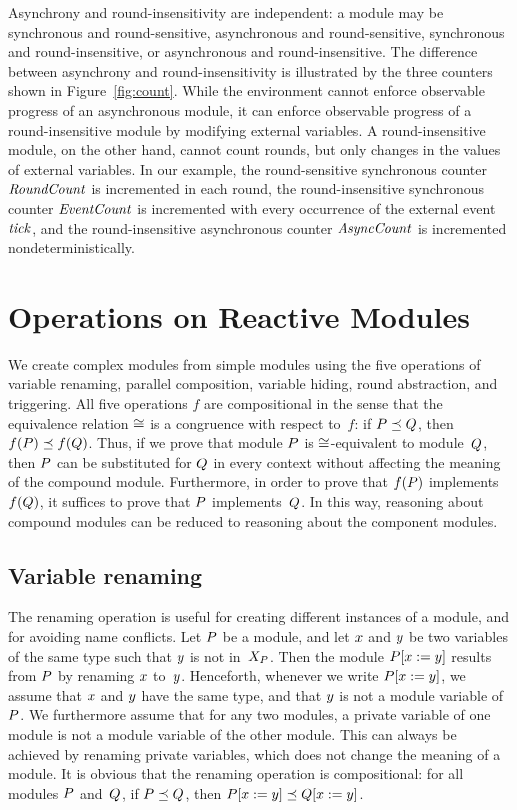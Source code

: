 \mypar
Asynchrony and round-insensitivity are independent:
a module may be synchronous and round-sensitive, asynchronous and
round-sensitive, synchronous and round-insensitive, or asynchronous and
round-insensitive.
The difference between asynchrony and round-insensitivity is illustrated by
the three counters shown in Figure~\ref{fig:count}.
While the environment cannot enforce observable progress of an asynchronous
module, it can enforce observable progress of a round-insensitive module by
modifying external variables.
A round-insensitive module, on the other hand, cannot count rounds, but only
changes in the values of external variables.
In our example, the round-sensitive synchronous counter ${\it RoundCount\/}$ is
incremented in each round, the round-insensitive synchronous counter
${\it EventCount\/}$ is incremented with every occurrence of the external event~${\it tick\/}$,
and the round-insensitive asynchronous counter ${\it AsyncCount\/}$ is incremented
nondeterministically.


\section{Operations on Reactive Modules}

We create complex modules from simple modules using the five operations of
variable renaming, parallel composition, variable hiding, round abstraction,
and triggering.
All five operations $f$ are compositional in the sense that the
equivalence relation $\cong$ is a congruence with respect to~$f$:
if ${P}\preceq{Q}$, then $f({P})\preceq f({Q})$.
Thus, if we prove that module ${P}$ is $\cong$-equivalent to module~${Q}$,
then ${P}$ can be substituted for ${Q}$ in every context without affecting
the meaning of the compound module.
Furthermore, in order to prove that $f({P})$ implements~$f({Q})$, it
suffices to prove that ${P}$ implements~${Q}$.
In this way, reasoning about compound modules can be reduced to reasoning
about the component modules.


\subsection{Variable renaming}

The renaming operation is useful for creating different instances of a
module, and for avoiding name conflicts.
Let ${P}$ be a module, and let $x$ and $y$ be two variables of the
same type such that $y$ is not in~$X_{{P}}$.
Then the module ${P}[x:=y]$ results from ${P}$ by renaming $x$
to~$y$.
Henceforth, whenever we write ${P}[x:=y]$, we assume that $x$ and
$y$ have the same type, and that $y$ is not a module variable
of~${P}$.
We furthermore assume that for any two modules, a private variable of one
module is not a module variable of the other module.
This can always be achieved by renaming private variables, which does not
change the meaning of a module.
It is obvious that the renaming operation is compositional:
for all modules ${P}$ and~${Q}$, if ${P}\preceq{Q}$, then
${P}[x:=y]\preceq{Q}[x:=y]$.


